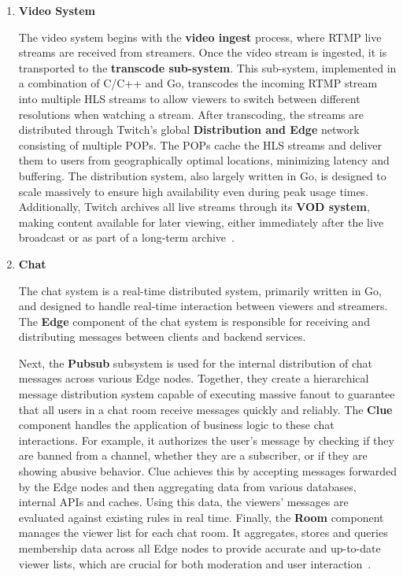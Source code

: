 \begin{enumerate}
    \item \textbf{Video System}
    
    The video system begins with the \textbf{video ingest} process, where \ac{RTMP} live streams are received from streamers. Once the video stream is ingested, it is transported to the \textbf{transcode sub-system}. This sub-system, implemented in a combination of C/C++ and Go, transcodes the incoming \ac{RTMP} stream into multiple \ac{HLS} streams to allow viewers to switch between different resolutions when watching a stream.
    After transcoding, the streams are distributed through Twitch's global \textbf{Distribution and Edge} network consisting of multiple \ac{POPs}. The \ac{POPs} cache the \ac{HLS} streams and deliver them to users from geographically optimal locations, minimizing latency and buffering. The distribution system, also largely written in Go, is designed to scale massively to ensure high availability even during peak usage times. Additionally, Twitch archives all live streams through its \textbf{\ac{VOD} system}, making content available for later viewing, either immediately after the live broadcast or as part of a long-term archive~\parencite{twitch_engineering}.
    
    \item \textbf{Chat}

    The chat system is a real-time distributed system, primarily written in Go, and designed to handle real-time interaction between viewers and streamers. The \textbf{Edge} component of the chat system is responsible for receiving and distributing messages between clients and backend services.
    
    Next, the \textbf{Pubsub} subsystem is used for the internal distribution of chat messages across various Edge nodes. Together, they create a hierarchical message distribution system capable of executing massive fanout to guarantee that all users in a chat room receive messages quickly and reliably. The \textbf{Clue} component handles the application of business logic to these chat interactions. For example, it authorizes the user's message by checking if they are banned from a channel, whether they are a subscriber, or if they are showing abusive behavior. Clue achieves this by accepting messages forwarded by the Edge nodes and then aggregating data from various databases, internal \ac{API}s and caches. Using this data, the viewers' messages are evaluated against existing rules in real time. Finally, the \textbf{Room} component manages the viewer list for each chat room. It aggregates, stores and queries membership data across all Edge nodes to provide accurate and up-to-date viewer lists, which are crucial for both moderation and user interaction~\parencite{twitch_chat}.


\end{enumerate}
